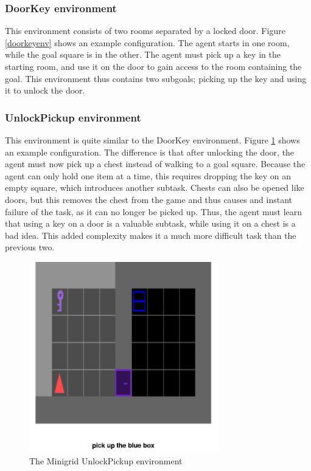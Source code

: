 \documentclass[conference]{IEEEtran}
\begin{document}
\subsubsection{DoorKey environment}

This environment consists of two rooms separated by a locked door. Figure \ref{doorkeyenv} shows an example configuration. The agent starts in one room, while the goal square is in the other. The agent must pick up a key in the starting room, and use it on the door to gain access to the room containing the goal. This environment thus contains two subgoals; picking up the key and using it to unlock the door.

\subsubsection{UnlockPickup environment}
\label{unlockpickupdescription}

This environment is quite similar to the DoorKey environment. Figure \ref{unlockpickupenv} shows an example configuration. The difference is that after unlocking the door, the agent must now pick up a chest instead of walking to a goal square. Because the agent can only hold one item at a time, this requires dropping the key on an empty square, which introduces another subtask. Chests can also be opened like doors, but this removes the chest from the game and thus causes and instant failure of the task, as it can no longer be picked up. Thus, the agent must learn that using a key on a door is a valuable subtask, while using it on a chest is a bad idea. This added complexity makes it a much more difficult task than the previous two.

\begin{figure}[h]
\centerline{\includegraphics[width=3.25in]{figure/unlockpickupenv.png}}
\caption{The Minigrid UnlockPickup environment}
\label{unlockpickupenv}
\end{figure}
\end{document}
